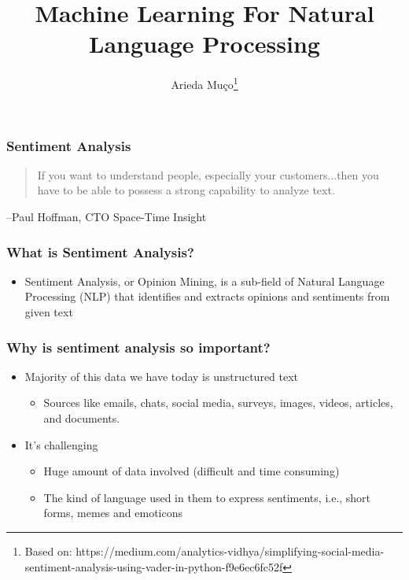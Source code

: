 \documentclass[compress, aspectratio=54]{beamer}
\title[Sentiment Analysis]{Machine Learning For Natural Language Processing}
\author[Arieda Mu\c co]{Arieda Mu\c co\footnote{Based on: https://medium.com/analytics-vidhya/simplifying-social-media-sentiment-analysis-using-vader-in-python-f9e6ec6fc52f}}
\institute[CEU]{Central European University}
\date{}
\begin{document}
\captionsetup[subfigure]{labelformat=empty}

\frame{\titlepage}



\begin{frame}
\frametitle{Sentiment Analysis}

\begin{quote}
If you want to understand people, especially your customers...then you have to be able to possess a strong capability to analyze text.
\end{quote}
\begin{flushright}
--Paul Hoffman, CTO Space-Time Insight
\end{flushright}

\end{frame}



\begin{frame}

\frametitle{What is Sentiment Analysis?}
\begin{itemize}
\item Sentiment Analysis, or Opinion Mining, is a sub-field of Natural Language Processing (NLP) that identifies and extracts opinions and sentiments from given text

\end{itemize}
\end{frame}

\begin{frame}

\frametitle{Why is sentiment analysis so important?}
\begin{itemize}
\item Majority of this data we have today is unstructured text
\begin{itemize}
\item Sources like emails, chats, social media, surveys, images, videos, articles, and documents. 
\end{itemize}
\item It's challenging
\begin{itemize}

 \item Huge amount of data involved (difficult and time consuming)
 \item The kind of language used in them to express sentiments, i.e., short forms, memes and emoticons
 \end{itemize}
\end{itemize}
\end{frame}
\end{document}
